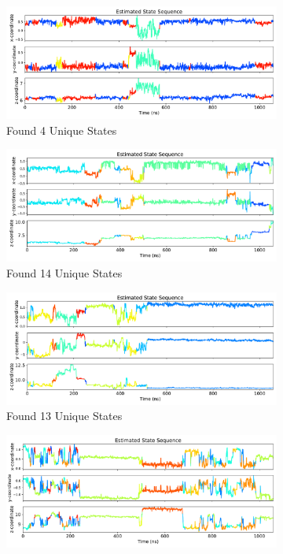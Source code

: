 \documentclass{article}
\begin{document}
  \begin{figure}
  \centering
  \begin{subfigure}{0.48\textwidth}
  \includegraphics[width=\textwidth]{seed_ACH21_segment0.pdf}
  \caption{Found 4 Unique States}\label{fig:segment1}
  \end{subfigure}
  \begin{subfigure}{0.48\textwidth}
  \includegraphics[width=\textwidth]{seed_ACH21_segment1.pdf}
  \caption{Found 14 Unique States}\label{fig:segment2}
  \end{subfigure}
  \begin{subfigure}{0.48\textwidth}
  \includegraphics[width=\textwidth]{seed_ACH21_segment2.pdf}
  \caption{Found 13 Unique States}\label{fig:segment3}
  \end{subfigure}
  \begin{subfigure}{0.48\textwidth}
  \includegraphics[width=\textwidth]{seed_ACH21_segment3.pdf}

\end{subfigure}
\end{figure}
\end{document}
